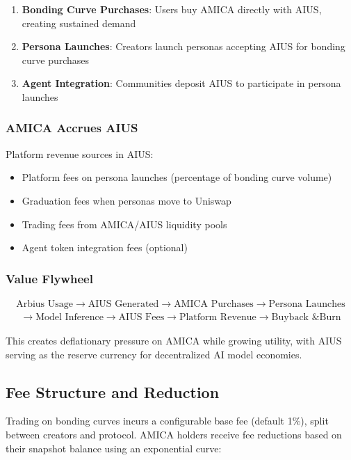 \documentclass{article}
\begin{document}
\begin{enumerate}
    \item \textbf{Bonding Curve Purchases}: Users buy AMICA directly with AIUS, creating sustained demand
    \item \textbf{Persona Launches}: Creators launch personas accepting AIUS for bonding curve purchases
    \item \textbf{Agent Integration}: Communities deposit AIUS to participate in persona launches
\end{enumerate}

\subsubsection{AMICA Accrues AIUS}

Platform revenue sources in AIUS:
\begin{itemize}
    \item Platform fees on persona launches (percentage of bonding curve volume)
    \item Graduation fees when personas move to Uniswap
    \item Trading fees from AMICA/AIUS liquidity pools
    \item Agent token integration fees (optional)
\end{itemize}

\subsubsection{Value Flywheel}

\begin{align}
\text{Arbius Usage} \rightarrow \text{AIUS Generated} \rightarrow \text{AMICA Purchases} \rightarrow \text{Persona Launches}
\end{align}
\begin{align}
\rightarrow \text{Model Inference} \rightarrow \text{AIUS Fees} \rightarrow \text{Platform Revenue} \rightarrow \text{Buyback \& Burn}
\end{align}

This creates deflationary pressure on AMICA while growing utility, with AIUS serving as the reserve currency for decentralized AI model economies.

\subsection{Fee Structure and Reduction}

Trading on bonding curves incurs a configurable base fee (default 1\%), split between creators and protocol. AMICA holders receive fee reductions based on their snapshot balance using an exponential curve:
\end{document}
